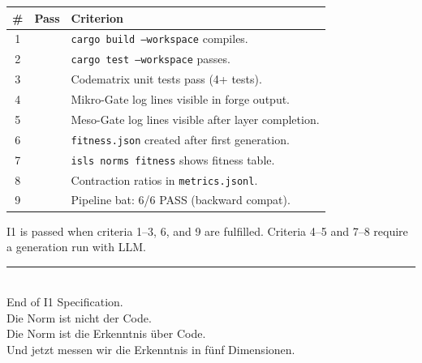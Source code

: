 \documentclass[11pt,a4paper]{article}
\begin{document}
\begin{longtable}{clp{9cm}}
\toprule
\textbf{\#} & \textbf{Pass} & \textbf{Criterion} \\
\midrule
1 & & \texttt{cargo build --workspace} compiles. \\
2 & & \texttt{cargo test --workspace} passes. \\
3 & & Codematrix unit tests pass (4+ tests). \\
4 & & Mikro-Gate log lines visible in forge output. \\
5 & & Meso-Gate log lines visible after layer completion. \\
6 & & \texttt{fitness.json} created after first generation. \\
7 & & \texttt{isls norms fitness} shows fitness table. \\
8 & & Contraction ratios in \texttt{metrics.jsonl}. \\
9 & & Pipeline bat: 6/6 PASS (backward compat). \\
\bottomrule
\end{longtable}

I1 is passed when criteria 1--3, 6, and 9 are fulfilled. 
Criteria 4--5 and 7--8 require a generation run with LLM.


\vfill
\begin{center}
\color{isls-gray}\rule{0.5\textwidth}{0.4pt}\\[0.5em]
{\small End of I1 Specification.\\[0.3em]
Die Norm ist nicht der Code.\\
Die Norm ist die Erkenntnis \"uber Code.\\
Und jetzt messen wir die Erkenntnis in f\"unf Dimensionen.}
\end{center}
\end{document}
